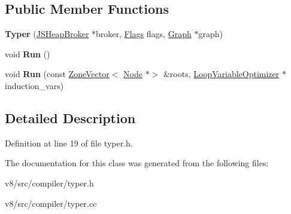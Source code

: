 \subsection*{Public Member Functions}
\begin{DoxyCompactItemize}
\item 
\mbox{\label{classv8_1_1internal_1_1compiler_1_1Typer_a739eb51bd7095c92b4af293a6a61f4a2}} 
{\bfseries Typer} (\mbox{\hyperlink{classv8_1_1internal_1_1compiler_1_1JSHeapBroker}{J\+S\+Heap\+Broker}} $\ast$broker, \mbox{\hyperlink{classv8_1_1base_1_1Flags}{Flags}} flags, \mbox{\hyperlink{classv8_1_1internal_1_1compiler_1_1Graph}{Graph}} $\ast$graph)
\item 
\mbox{\label{classv8_1_1internal_1_1compiler_1_1Typer_a237e27a719f52772f0c03bb181dd67b1}} 
void {\bfseries Run} ()
\item 
\mbox{\label{classv8_1_1internal_1_1compiler_1_1Typer_a97be2c16a0a8262768b47b58186e9785}} 
void {\bfseries Run} (const \mbox{\hyperlink{classv8_1_1internal_1_1ZoneVector}{Zone\+Vector}}$<$ \mbox{\hyperlink{classv8_1_1internal_1_1compiler_1_1Node}{Node}} $\ast$$>$ \&roots, \mbox{\hyperlink{classv8_1_1internal_1_1compiler_1_1LoopVariableOptimizer}{Loop\+Variable\+Optimizer}} $\ast$induction\+\_\+vars)
\end{DoxyCompactItemize}


\subsection{Detailed Description}


Definition at line 19 of file typer.\+h.



The documentation for this class was generated from the following files\+:\begin{DoxyCompactItemize}
\item 
v8/src/compiler/typer.\+h\item 
v8/src/compiler/typer.\+cc\end{DoxyCompactItemize}
